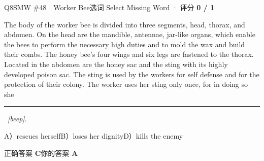 \begin{qblock}{Q8\quad SMW \#48\ \ Worker Bee}{选词 Select Missing Word · 评分 \textcolor{cAccent}{\bfseries 0 / 1}}
\begin{promptbox}
The body of the worker bee is divided into three segments, head, thorax, and abdomen. On the head are the mandible, antennae, jar-like organs, which enable the bees to perform the necessary high duties and to mold the wax and build their combs. The honey bee's four wings and six legs are fastened to the thorax. Located in the abdomen are the honey sac and the sting with its highly developed poison sac. The sting is used by the workers for self defense and for the protection of their colony. The worker uses her sting only once, for in doing so she \rule{1.2cm}{0.4pt}\ \textit{[beep]}.
\end{promptbox}
{\small A）rescues herself\quad B）loses her dignity\quad D）kills the enemy}
\smallskip\par
{\small 正确答案 \textcolor{cFix}{\bfseries C}\qquad 你的答案 {\color{cWrong}\bfseries A}}
\end{qblock}

